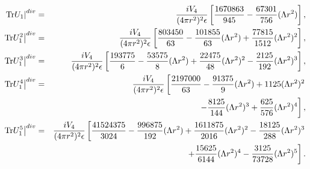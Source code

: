 \documentclass[a4paper,aps,preprint,groupedaddress,showpacs]{revtex4}
\begin{document}
\begin{eqnarray}
\left.{\rm Tr}U_{1}\right\vert^{div}&=&
\frac{iV_{4}}{(4\pi r^{2})^{2}\epsilon}
\left[\frac{1670863}{945}-
\frac{67301}{756}(\Lambda r^{2})\right],
\\
\left.{\rm Tr}U_{1}^{2}\right\vert^{div}&=&
\frac{iV_{4}}{(4\pi r^{2})^{2}\epsilon}
\left[\frac{803450}{63}-
\frac{101855}{63}(\Lambda r^{2})+
\frac{77815}{1512}(\Lambda r^{2})^{2}\right],
\\
\left.{\rm Tr}U_{1}^{3}\right\vert^{div}&=&
\frac{iV_{4}}{(4\pi r^{2})^{2}\epsilon}
\left[\frac{193775}{6}-
\frac{53575}{8}(\Lambda r^{2})+
\frac{22475}{48}(\Lambda r^{2})^{2}-
\frac{2125}{192}(\Lambda r^{2})^{3}
\right],
\\
\left.{\rm Tr}U_{1}^{4}\right\vert^{div}&=&
\frac{iV_{4}}{(4\pi r^{2})^{2}\epsilon}
\left[\frac{2197000}{63}-
\frac{91375}{9}(\Lambda r^{2})+
1125(\Lambda r^{2})^{2}\right.
\nonumber\\
&&\ \ \left.-
\frac{8125}{144}(\Lambda r^{2})^{3}+
\frac{625}{576}(\Lambda r^{2})^{4}
\right],
\\
\left.{\rm Tr}U_{1}^{5}\right\vert^{div}&=&
\frac{iV_{4}}{(4\pi r^{2})^{2}\epsilon}
\left[\frac{41524375}{3024}-
\frac{996875}{192}(\Lambda r^{2})+
\frac{1611875}{2016}(\Lambda r^{2})^{2}-
\frac{18125}{288}(\Lambda r^{2})^{3}\right.
\nonumber\\
&&\ \ \left.
+\frac{15625}{6144}(\Lambda r^{2})^{4}-
\frac{3125}{73728}(\Lambda r^{2})^{5}
\right].
\end{eqnarray}
\end{document}
